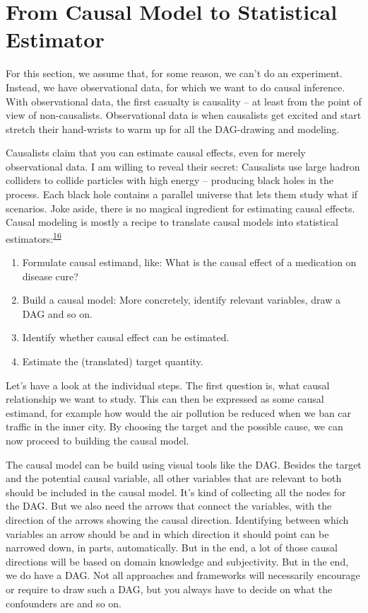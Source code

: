 \documentclass[
  10pt,
]{scrbook}
\providecommand{\tightlist}{%
  \setlength{\itemsep}{0pt}\setlength{\parskip}{0pt}}
\begin{document}
\hypertarget{from-causal-model-to-statistical-estimator}{%
\section{From Causal Model to Statistical Estimator}\label{from-causal-model-to-statistical-estimator}}

For this section, we assume that, for some reason, we can't do an experiment.
Instead, we have observational data, for which we want to do causal inference.
With observational data, the first casualty is causality -- at least from the point of view of non-causalists.
Observational data is when causalists get excited and start stretch their hand-wrists to warm up for all the DAG-drawing and modeling.

Causalists claim that you can estimate causal effects, even for merely observational data.
I am willing to reveal their secret:
Causalists use large hadron colliders to collide particles with high energy -- producing black holes in the process.
Each black hole contains a parallel universe that lets them study what if scenarios.
Joke aside, there is no magical ingredient for estimating causal effects.
Causal modeling is mostly a recipe to translate causal models into statistical estimators:\textsuperscript{\protect\hyperlink{ref-pearl2009causal}{16}}

\begin{enumerate}
\def\labelenumi{\arabic{enumi}.}
\tightlist
\item
  Formulate causal estimand, like: What is the causal effect of a medication on disease cure?
\item
  Build a causal model: More concretely, identify relevant variables, draw a DAG and so on.
\item
  Identify whether causal effect can be estimated.
\item
  Estimate the (translated) target quantity.
\end{enumerate}

Let's have a look at the individual steps.
The first question is, what causal relationship we want to study.
This can then be expressed as some causal estimand, for example how would the air pollution be reduced when we ban car traffic in the inner city.
By choosing the target and the possible cause, we can now proceed to building the causal model.

The causal model can be build using visual tools like the DAG.
Besides the target and the potential causal variable, all other variables that are relevant to both should be included in the causal model.
It's kind of collecting all the nodes for the DAG.
But we also need the arrows that connect the variables, with the direction of the arrows showing the causal direction.
Identifying between which variables an arrow should be and in which direction it should point can be narrowed down, in parts, automatically.
But in the end, a lot of those causal directions will be based on domain knowledge and subjectivity.
But in the end, we do have a DAG.
Not all approaches and frameworks will necessarily encourage or require to draw such a DAG, but you always have to decide on what the confounders are and so on.
\end{document}
